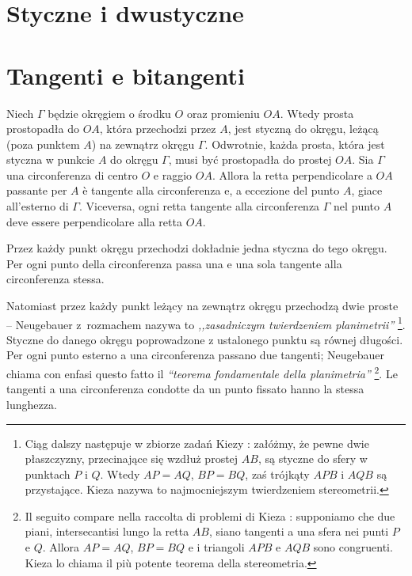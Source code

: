 %

\section{Styczne i dwustyczne} %
\section{Tangenti e bitangenti} %

\begin{proposition}
    Niech $\Gamma$ będzie okręgiem o środku $O$ oraz promieniu $OA$. %
    Wtedy prosta prostopadła do $OA$, która przechodzi przez $A$, jest styczną do okręgu, leżącą (poza punktem $A$) na zewnątrz okręgu $\Gamma$. %
    Odwrotnie, każda prosta, która jest styczna w punkcie $A$ do okręgu $\Gamma$, musi być prostopadła do prostej $OA$. %
    Sia $\Gamma$ una circonferenza di centro $O$ e raggio $OA$. %
    Allora la retta perpendicolare a $OA$ passante per $A$ è tangente alla circonferenza e, a eccezione del punto $A$, giace all'esterno di $\Gamma$. %
    Viceversa, ogni retta tangente alla circonferenza $\Gamma$ nel punto $A$ deve essere perpendicolare alla retta $OA$. %
\end{proposition} %

\begin{corollary}
    Przez każdy punkt okręgu przechodzi dokładnie jedna styczna do tego okręgu. %
    Per ogni punto della circonferenza passa una e una sola tangente alla circonferenza stessa. %
\end{corollary} %

Natomiast przez każdy punkt leżący na zewnątrz okręgu przechodzą dwie proste -- Neugebauer \cite[s. 34]{neugebauer_2018} z~rozmachem nazywa to \emph{,,zasadniczym twierdzeniem planimetrii''}%
\footnote{Ciąg dalszy następuje w zbiorze zadań Kiezy \cite[s. 28]{kieza_2017}: załóżmy, że pewne dwie płaszczyzny, przecinające się wzdłuż prostej $AB$, są styczne do sfery w punktach $P$ i $Q$. Wtedy $AP = AQ$, $BP = BQ$, zaś trójkąty $APB$ i $AQB$ są przystające. Kieza nazywa to najmocniejszym twierdzeniem stereometrii.}. %
Styczne do danego okręgu poprowadzone z ustalonego punktu są równej długości. %
Per ogni punto esterno a una circonferenza passano due tangenti; Neugebauer \cite[p. 34]{neugebauer_2018} chiama con enfasi questo fatto il \emph{``teorema fondamentale della planimetria''}%
\footnote{Il seguito compare nella raccolta di problemi di Kieza \cite[p. 28]{kieza_2017}: supponiamo che due piani, intersecantisi lungo la retta $AB$, siano tangenti a una sfera nei punti $P$ e $Q$. Allora $AP = AQ$, $BP = BQ$ e i triangoli $APB$ e $AQB$ sono congruenti. Kieza lo chiama il più potente teorema della stereometria.}. %
Le tangenti a una circonferenza condotte da un punto fissato hanno la stessa lunghezza. %

